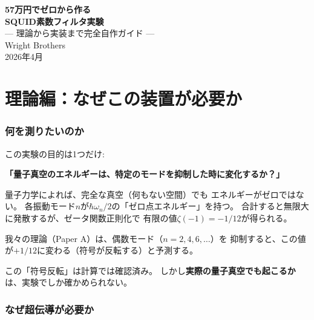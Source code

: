 \documentclass[12pt,a4paper]{article}
\begin{document}
\begin{center}
{\LARGE\bfseries 57万円でゼロから作る}\\[0.3cm]
{\LARGE\bfseries SQUID素数フィルタ実験}\\[0.5cm]
{\large --- 理論から実装まで完全自作ガイド ---}\\[1.5cm]
{\large Wright Brothers}\\[0.3cm]
{2026年4月}
\end{center}

\vspace{0.5cm}
\tableofcontents
\newpage

\part{理論編：なぜこの装置が必要か}

\section{何を測りたいのか}

この実験の目的は1つだけ:

\textbf{「量子真空のエネルギーは、特定のモードを抑制した時に変化するか？」}

量子力学によれば、完全な真空（何もない空間）でも
エネルギーがゼロではない。
各振動モード$n$が$\hbar\omega_n/2$の「ゼロ点エネルギー」を持つ。
合計すると無限大に発散するが、ゼータ関数正則化で
有限の値$\zeta(-1) = -1/12$が得られる。

我々の理論（Paper A）は、偶数モード（$n = 2, 4, 6, \ldots$）を
抑制すると、この値が$+1/12$に変わる（符号が反転する）と予測する。

この「符号反転」は計算では確認済み。
しかし\textbf{実際の量子真空でも起こるか}は、実験でしか確かめられない。

\section{なぜ超伝導が必要か}
\end{document}
